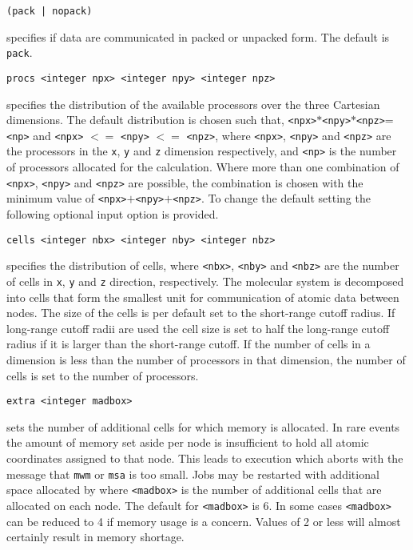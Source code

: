 \begin{description}
\item
\begin{verbatim}
(pack | nopack)
\end{verbatim}
specifies if data are communicated in packed or unpacked form. The
default is \verb+pack+.

\item
\begin{verbatim}
procs <integer npx> <integer npy> <integer npz>
\end{verbatim}
specifies the distribution of the available processors over the three 
Cartesian dimensions. The default distribution is chosen such that, 
\verb+<npx>+$*$\verb+<npy>+$*$\verb+<npz>+=\verb+<np>+
and \verb+<npx>+ $<=$ \verb+<npy>+ $<=$ \verb+<npz>+, 
where \verb+<npx>+, \verb+<npy>+ and \verb+<npz>+ are the processors in the
\verb+x+, \verb+y+ and \verb+z+ dimension respectively, and \verb+<np>+ is the number of processors
allocated for the calculation. Where more than one combination
of \verb+<npx>+, \verb+<npy>+ and \verb+<npz>+ are possible, the 
combination is chosen with the minimum value of 
\verb+<npx>+$+$\verb+<npy>+$+$\verb+<npz>+. To change the default setting
the following optional input option is provided.

\item
\begin{verbatim}
cells <integer nbx> <integer nby> <integer nbz>
\end{verbatim}
specifies the distribution of cells,
where \verb+<nbx>+, \verb+<nby>+ and \verb+<nbz>+ are the number of
cells in \verb+x+, \verb+y+ and \verb+z+ direction, respectively.
The molecular system is decomposed into cells that form the smallest
unit for communication of atomic data between nodes. The size of the
cells is per default set to the short-range cutoff radius. If
long-range cutoff radii  are used the cell size is set to half the
long-range cutoff radius if it is larger than the short-range cutoff.
If the number of cells in a dimension is less than the number of
processors in that dimension, the number of cells is set to the number
of processors.

\item
\begin{verbatim}
extra <integer madbox>
\end{verbatim}
sets the number of additional cells for which memory is allocated.
In rare events the amount of memory set aside per node is insufficient
to hold all atomic coordinates assigned to that node. This leads to 
execution which aborts with the message that {\tt mwm} or {\tt msa} is too
small. Jobs may be restarted with additional space allocated by
where \verb+<madbox>+ is the number of additional cells that are allocated
on each node. The default for \verb+<madbox>+ is 6. 
In some cases \verb+<madbox>+ can be reduced to 4 if memory usage is a
concern. Values of 2 or less will almost certainly result in memory 
shortage.


\end{description}
